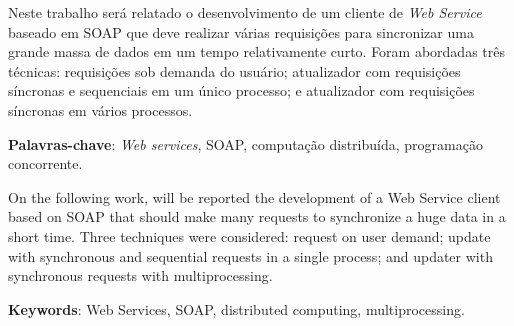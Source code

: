 %
%


Neste trabalho será relatado o desenvolvimento de um cliente de \textit{Web Service} baseado em SOAP que deve realizar várias requisições para sincronizar uma grande massa de dados em um tempo relativamente curto. Foram abordadas três técnicas: requisições sob demanda do usuário; atualizador com requisições síncronas e sequenciais em um único processo; e atualizador com requisições síncronas em vários processos.

\vspace{1.5ex}

{\bf Palavras-chave}: \textit{Web services}, SOAP, computação distribuída, programação concorrente.
%
%


On the following work, will be reported the development of a Web Service client based on SOAP that should make many requests to synchronize a huge data in a short time. Three techniques were considered: request on user demand; update with synchronous and sequential requests in a single process; and updater with synchronous requests with multiprocessing.

\vspace{1.5ex}

{\bf Keywords}: Web Services, SOAP, distributed computing, multiprocessing.
